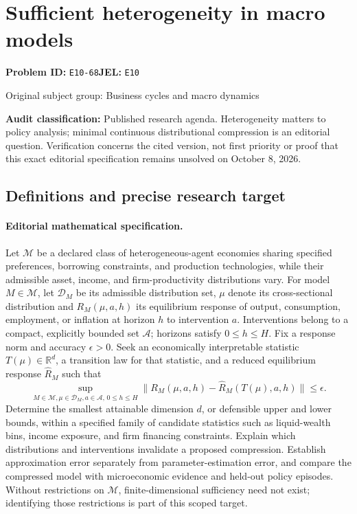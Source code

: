 \documentclass[11pt,a4paper]{article}
\begin{document}
\section*{Sufficient heterogeneity in macro models}
\textbf{Problem ID:} \texttt{E10-68}\quad \textbf{JEL:} \texttt{E10}\par
\label{problem:OP-0234}
{\sffamily\small\color{muted}Original subject group: Business cycles and macro dynamics\par}
\label{definitions:problem:30007515}
\textbf{Audit classification:} Published research agenda. Heterogeneity matters to policy analysis; minimal continuous distributional compression is an editorial question. Verification concerns the cited version, not first priority or proof that this exact editorial specification remains unsolved on October 8, 2026.
\subsection*{Definitions and precise research target}
\paragraph{Editorial mathematical specification.} Let \(\mathcal M\) be a declared class of heterogeneous-agent economies sharing specified preferences, borrowing constraints, and production technologies, while their admissible asset, income, and firm-productivity distributions vary. For model \(M\in\mathcal M\), let \(\mathcal D_M\) be its admissible distribution set, \(\mu\) denote its cross-sectional distribution and \(R_M(\mu,a,h)\) its equilibrium response of output, consumption, employment, or inflation at horizon \(h\) to intervention \(a\). Interventions belong to a compact, explicitly bounded set \(\mathcal A\); horizons satisfy \(0\le h\le H\). Fix a response norm and accuracy \(\epsilon>0\).
Seek an economically interpretable statistic \(T(\mu)\in\mathbb R^d\), a transition law for that statistic, and a reduced equilibrium response \(\widehat R_M\) such that
\[
\sup_{M\in\mathcal M,\mu\in\mathcal D_M,a\in\mathcal A,\,0\le h\le H}
\|R_M(\mu,a,h)-\widehat R_M(T(\mu),a,h)\|\le\epsilon.
\]
Determine the smallest attainable dimension \(d\), or defensible upper and lower bounds, within a specified family of candidate statistics such as liquid-wealth bins, income exposure, and firm financing constraints. Explain which distributions and interventions invalidate a proposed compression. Establish approximation error separately from parameter-estimation error, and compare the compressed model with microeconomic evidence and held-out policy episodes. Without restrictions on \(\mathcal M\), finite-dimensional sufficiency need not exist; identifying those restrictions is part of this scoped target.
\end{document}
